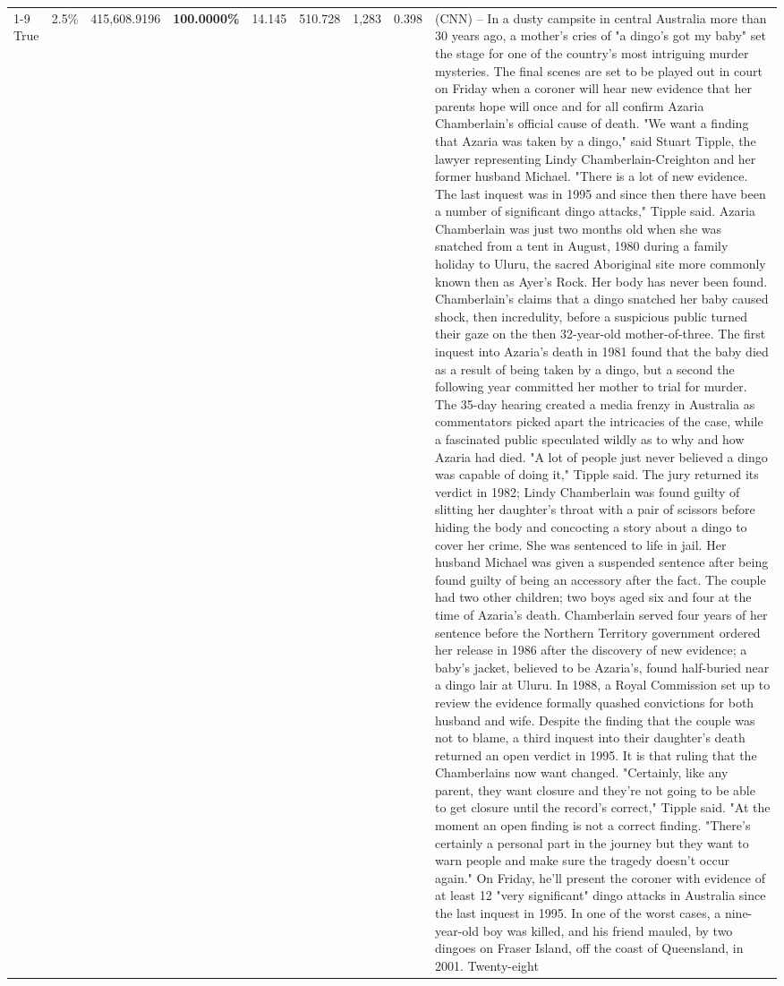 \begin{table}[H]
\begin{tabular}{lllrlllll}
\cline{1-9}
True & 2.5\% & 415,608.9196 & \bfseries \color{red} 100.0000\% & 14.145 & 510.728 & 1,283 & 0.398 & (CNN) -- In a dusty campsite in central Australia more than 30 years ago, a mother's cries of "a dingo's got my baby" set the stage for one of the country's most intriguing murder mysteries. The final scenes are set to be played out in court on Friday when a coroner will hear new evidence that her parents hope will once and for all confirm Azaria Chamberlain's official cause of death. "We want a finding that Azaria was taken by a dingo," said Stuart Tipple, the lawyer representing Lindy Chamberlain-Creighton and her former husband Michael. "There is a lot of new evidence. The last inquest was in 1995 and since then there have been a number of significant dingo attacks," Tipple said. Azaria Chamberlain was just two months old when she was snatched from a tent in August, 1980 during a family holiday to Uluru, the sacred Aboriginal site more commonly known then as Ayer's Rock. Her body has never been found. Chamberlain's claims that a dingo snatched her baby caused shock, then incredulity, before a suspicious public turned their gaze on the then 32-year-old mother-of-three. The first inquest into Azaria's death in 1981 found that the baby died as a result of being taken by a dingo, but a second the following year committed her mother to trial for murder. The 35-day hearing created a media frenzy in Australia as commentators picked apart the intricacies of the case, while a fascinated public speculated wildly as to why and how Azaria had died. "A lot of people just never believed a dingo was capable of doing it," Tipple said. The jury returned its verdict in 1982; Lindy Chamberlain was found guilty of slitting her daughter's throat with a pair of scissors before hiding the body and concocting a story about a dingo to cover her crime. She was sentenced to life in jail. Her husband Michael was given a suspended sentence after being found guilty of being an accessory after the fact. The couple had two other children; two boys aged six and four at the time of Azaria's death. Chamberlain served four years of her sentence before the Northern Territory government ordered her release in 1986 after the discovery of new evidence; a baby's jacket, believed to be Azaria's, found half-buried near a dingo lair at Uluru. In 1988, a Royal Commission set up to review the evidence formally quashed convictions for both husband and wife. Despite the finding that the couple was not to blame, a third inquest into their daughter's death returned an open verdict in 1995. It is that ruling that the Chamberlains now want changed. "Certainly, like any parent, they want closure and they're not going to be able to get closure until the record's correct," Tipple said. "At the moment an open finding is not a correct finding. "There's certainly a personal part in the journey but they want to warn people and make sure the tragedy doesn't occur again." On Friday, he'll present the coroner with evidence of at least 12 "very significant" dingo attacks in Australia since the last inquest in 1995. In one of the worst cases, a nine-year-old boy was killed, and his friend mauled, by two dingoes on Fraser Island, off the coast of Queensland, in 2001. Twenty-eight 
\end{tabular}
\end{table}
